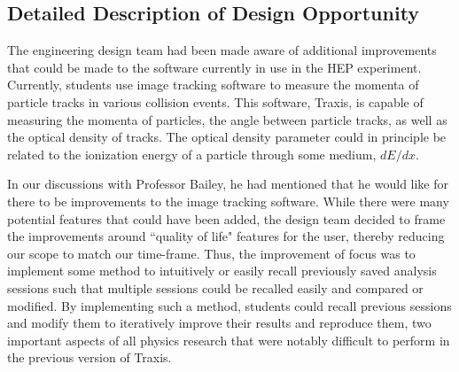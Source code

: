 \documentclass[12pt]{article} %
\begin{document}
\subsection{Detailed Description of Design Opportunity}\label{Detailed Description_Software}
The engineering design team had been made aware of additional improvements that could be made to the software currently in use in the HEP experiment. Currently, students use image tracking software to measure the momenta of particle tracks in various collision events. This software, Traxis, is capable of measuring the momenta of particles, the angle between particle tracks, as well as the optical density of tracks. The optical density parameter could in principle be related to the ionization energy of a particle through some medium, $dE/dx$. %

In our discussions with Professor Bailey, he had mentioned that he would like for there to be improvements to the image tracking software. While there were many potential features that could have been added, the design team decided to frame the improvements around ``quality of life" features for the user, thereby reducing our scope to match our time-frame. Thus, the improvement of focus was to implement some method to intuitively or easily recall previously saved analysis sessions such that multiple sessions could be recalled easily and compared or modified. By implementing such a method, students could recall previous sessions and modify them to iteratively improve their results and reproduce them, two important aspects of all physics research that were notably difficult to perform in the previous version of Traxis.
\end{document}
